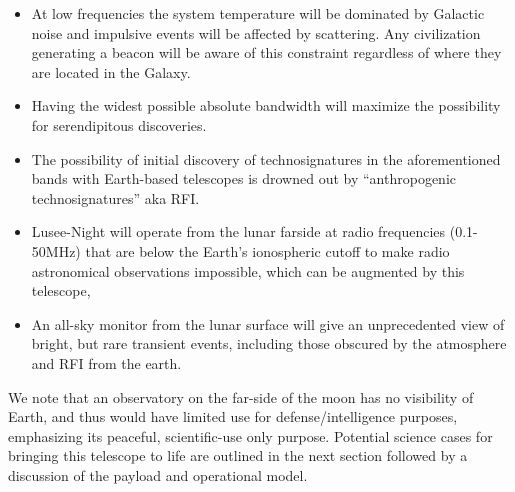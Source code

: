 \begin{itemize}
    \item At low frequencies the system temperature will be dominated by Galactic noise and impulsive events will be affected by scattering. Any civilization generating a beacon will be aware of this constraint regardless of where they are located in the Galaxy.
    \item Having the widest possible absolute bandwidth will maximize the possibility for serendipitous discoveries.
    \item The possibility of initial discovery of technosignatures in the aforementioned bands with Earth-based telescopes is drowned out by ``anthropogenic technosignatures” aka RFI.
   \item Lusee-Night will operate from the lunar farside at radio frequencies (0.1-50MHz) that are below the Earth's ionospheric cutoff to make radio astronomical observations impossible, which can be augmented by this telescope,
    \item An all-sky monitor from the lunar surface will give an unprecedented view of bright, but rare transient events, including those obscured by the atmosphere and RFI from the earth.
\end{itemize}

We note that an observatory on the far-side of the moon has no visibility of Earth, and thus would have limited use for defense/intelligence purposes, emphasizing its peaceful, scientific-use only purpose. Potential science cases for bringing this telescope to life are outlined in the next section followed by a discussion of the payload and operational model.